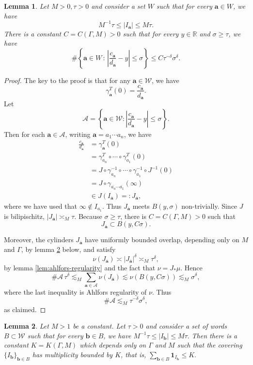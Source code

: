 \documentclass[12pt]{amsart}
\newcommand{\R}{\mathbb{R}}
\newcommand*\abs[1]{
	\left|#1\right|
}
\newtheorem{lem}{Lemma}[section]
\theoremstyle{definition}
\renewcommand{\leq}{\leqslant}
\renewcommand{\geq}{\geqslant}
\begin{document}
\begin{lem}\label{lem:NC-quotient}
Let $M > 0, \tau > 0$ and consider a set $W$ such that for every $\mathbf{a} \in W$, we have
\[M^{-1}\tau \leq \abs{I_\mathbf{a}} \leq M\tau.\]
There is a constant $C = C(\Gamma, M) > 0$ such that for every $y \in \R$ and $\sigma \geq \tau$, we have
\[\#\left\{\mathbf{a} \in W\,:\,\abs{\frac{c_\mathbf{a}}{d_\mathbf{a}} - y} \leq \sigma\right\} \leq C\tau^{-\delta}\sigma^{\delta}.\]
\end{lem}

\begin{proof}
The key to the proof is that for any $\mathbf{a} \in \mathcal{W}$, we have
\[
\gamma_\mathbf{a}^T(0)=\frac{c_\mathbf{a}}{d_\mathbf{a}}.
\]
Let
\[
\mathcal A=\left\{\mathbf{a}\in\mathcal W:\left|\frac{c_\mathbf{a}}{d_\mathbf{a}}-y\right|\le\sigma\right\}.
\]
Then for each $\mathbf a\in\mathcal A$, writing
$\mathbf{a} = a_1\cdots a_n$, we have
\begin{align*}
\frac{c_\mathbf a}{d_\mathbf a}
&=\gamma_\mathbf a^T(0)\\
&=\gamma_{a_n}^T\circ \cdots \circ \gamma_{a_1}^T(0)\\
&=J \circ \gamma_{a_n}^{-1}\circ \cdots \circ \gamma_{a_1}^{-1}\circ J^{-1}(0)\\
&=J\circ\gamma_{\overline{a_n}\cdots\overline{a_1}}(\infty)\\
&\in J(I_{\overline{\mathbf{a}}}) =: J_{\overline{\mathbf{a}}},
\end{align*}
where we have used that $\infty\notin I_{a_1}$. Thus
$J_{\overline{\mathbf a}}$ meets $B(y,\sigma)$ non-trivially. Since $J$ is bilipischitz,
$|J_{\overline{\mathbf a}}|\asymp_M\tau$. Because $\sigma\ge\tau$, there is
$C=C(\Gamma, M)>0$ such that
\[
J_{\overline{\mathbf a}}\subset B(y,C\sigma).
\]

Moreover, the cylinders $J_{\overline{\mathbf a}}$ have uniformly bounded
overlap, depending only on $M$ and $\Gamma$, by lemma \ref{lem:bounded-multiplicity} below, and satisfy
\[
\nu(J_{\overline{\mathbf a}})
\asymp |J_{\overline{\mathbf a}}|^\delta
\asymp_M \tau^\delta,
\]
by lemma \ref{lem:ahlfors-regularity} and the fact that $\nu = J_{*}\mu$. Hence
\[
\#\mathcal A\,\tau^\delta
\lesssim_M
\sum_{\mathbf a\in\mathcal A}\nu(J_{\overline{\mathbf a}})
\lesssim
\nu(B(y,C\sigma))
\lesssim_M
\sigma^\delta,
\]
where the last inequality is Ahlfors regularity of $\nu$. Thus
\[
\#\mathcal A\lesssim_M \tau^{-\delta}\sigma^\delta,
\]
as claimed.
\end{proof}
\begin{lem}
\label{lem:bounded-multiplicity}
Let $M > 1$ be a constant. Let $\tau > 0$ and consider a set of words $B \subset\mathcal{W}$ such that for every $\mathbf{b} \in B$, we have
$M^{-1}\tau \leq \abs{I_\mathbf{b}} \leq M\tau.$
Then there is a constant $K = K(\Gamma, M)$ which depends only on $\Gamma$ and $M$ such that the covering $\{I_\mathbf{b}\}_{\mathbf{b} \in B}$ has multiplicity bounded by $K$, that is,
$\sum_{\mathbf{b} \in B} \mathbf{1}_{I_\mathbf{b}} \leq K.$
\end{lem}
\end{document}
